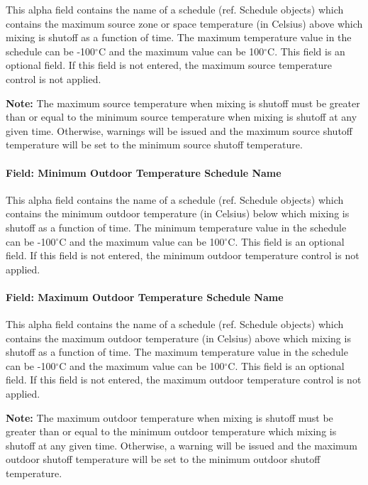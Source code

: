 This alpha field contains the name of a schedule (ref. Schedule objects) which contains the maximum source zone or space temperature (in Celsius) above which mixing is shutoff as a function of time. The maximum temperature value in the schedule can be -100$^\circ$C and the maximum value can be 100$^\circ$C. This field is an optional field. If this field is not entered, the maximum source temperature control is not applied.

\textbf{Note:} The maximum source temperature when mixing is shutoff must be greater than or equal to the minimum source temperature when mixing is shutoff at any given time. Otherwise, warnings will be issued and the maximum source shutoff temperature will be set to the minimum source shutoff temperature.

\paragraph{Field: Minimum Outdoor Temperature Schedule Name}\label{field-minimum-outdoor-temperature-schedule-name-2}

This alpha field contains the name of a schedule (ref. Schedule objects) which contains the minimum outdoor temperature (in Celsius) below which mixing is shutoff as a function of time. The minimum temperature value in the schedule can be -100$^\circ$C and the maximum value can be 100$^\circ$C. This field is an optional field. If this field is not entered, the minimum outdoor temperature control is not applied.

\paragraph{Field: Maximum Outdoor Temperature Schedule Name}\label{field-maximum-outdoor-temperature-schedule-name-2}

This alpha field contains the name of a schedule (ref. Schedule objects) which contains the maximum outdoor temperature (in Celsius) above which mixing is shutoff as a function of time. The maximum temperature value in the schedule can be -100$^\circ$C and the maximum value can be 100$^\circ$C. This field is an optional field. If this field is not entered, the maximum outdoor temperature control is not applied.

\textbf{Note:} The maximum outdoor temperature when mixing is shutoff must be greater than or equal to the minimum outdoor temperature which mixing is shutoff at any given time. Otherwise, a warning will be issued and the maximum outdoor shutoff temperature will be set to the minimum outdoor shutoff temperature.

